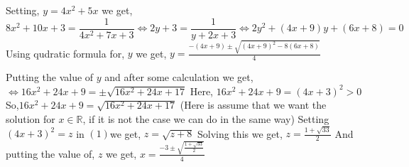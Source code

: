 \documentclass{article}
\begin{document}
Setting, $y=4x^2+5x$ we get,
\[
8x^2+10x+3=\frac{1}{4x^2+7x+3}
\Leftrightarrow 2y+3=\frac{1}{y+2x+3}
\Leftrightarrow 2y^2+(4x+9)y+(6x+8)=0
\]
Using qudratic formula for, $y$ we get,
$y=\frac{-(4x+9) \pm \sqrt{(4x+9)^2-8(6x+8)}}{4}$

Putting the value of $y$ and after some calculation we get,
$\Leftrightarrow 16x^2+24x+9=\pm \sqrt{16x^2+24x+17}$
Here, $16x^2+24x+9=(4x+3)^2>0$ 
So,$\begin{equation}16x^2+24x+9=\sqrt{16x^2+24x+17}\end{equation}$
(Here is assume that we want the solution for $x \in \mathbb{R}$, if it is not the case we can do in the same way)
Setting $(4x+3)^2=z$ in $(1)$we get,
$z=\sqrt{z+8}$
Solving this we get,
$z=\frac{1+\sqrt{33}}{2}$
And putting the value of, $z$ we get,
$x=\frac{-3 \pm \sqrt{\frac{1+\sqrt{33}}{2}}}{4}$
\end{document}

